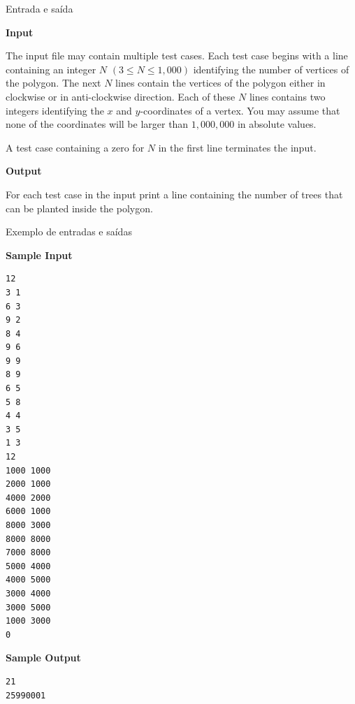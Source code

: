 \begin{frame}[fragile]{Entrada e saída}

\textbf{Input}

The input file may contain multiple test cases. Each test case begins with a line containing an
integer $N$ $(3\leq N\leq 1,000)$ identifying the number of vertices of the polygon. The next
$N$ lines contain the vertices of the polygon either in clockwise or in anti-clockwise direction. 
Each of these $N$ lines contains two integers identifying the $x$ and $y$-coordinates of a vertex. 
You may assume that none of the coordinates will be larger than $1,000,000$ in absolute values.

A test case containing a zero for $N$ in the first line terminates the input.

\textbf{Output}

For each test case in the input print a line containing the number of trees that can be planted inside the polygon.

\end{frame}

\begin{frame}[fragile]{Exemplo de entradas e saídas}

\begin{tiny}
\begin{minipage}[t]{0.5\textwidth}
\textbf{Sample Input}
\begin{verbatim}
12
3 1
6 3
9 2
8 4
9 6
9 9
8 9
6 5
5 8
4 4
3 5
1 3
12
1000 1000
2000 1000
4000 2000
6000 1000
8000 3000
8000 8000
7000 8000
5000 4000
4000 5000
3000 4000
3000 5000
1000 3000
0
\end{verbatim}
\end{minipage}
\begin{minipage}[t]{0.45\textwidth}
\textbf{Sample Output}
\begin{verbatim}
21
25990001
\end{verbatim}
\end{minipage}
\end{tiny}
\end{frame}

